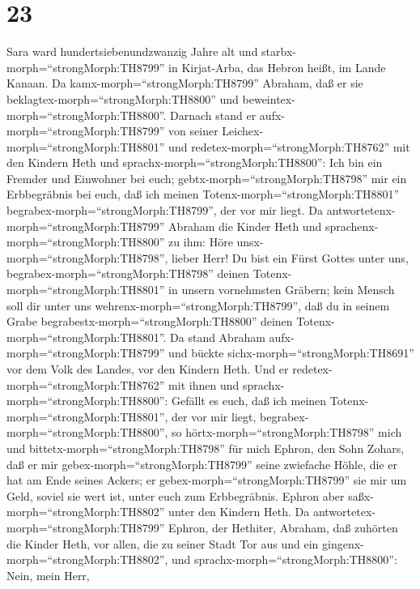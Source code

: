 \hypertarget{section-22}{%
\section{23}\label{section-22}}

 Sara ward hundertsiebenundzwanzig Jahre alt 
und starbx-morph=``strongMorph:TH8799'' in Kirjat-Arba, das Hebron
heißt, im Lande Kanaan. Da kamx-morph=``strongMorph:TH8799'' Abraham,
daß er sie beklagtex-morph=``strongMorph:TH8800'' und
beweintex-morph=``strongMorph:TH8800''.  Darnach stand er
aufx-morph=``strongMorph:TH8799'' von seiner
Leichex-morph=``strongMorph:TH8801'' und
redetex-morph=``strongMorph:TH8762'' mit den Kindern Heth und
sprachx-morph=``strongMorph:TH8800'':  Ich bin ein Fremder
und Einwohner bei euch; gebtx-morph=``strongMorph:TH8798'' mir ein
Erbbegräbnis bei euch, daß ich meinen
Totenx-morph=``strongMorph:TH8801''
begrabex-morph=``strongMorph:TH8799'', der vor mir liegt. 
Da antwortetenx-morph=``strongMorph:TH8799'' Abraham die Kinder Heth und
sprachenx-morph=``strongMorph:TH8800'' zu ihm:  Höre
unsx-morph=``strongMorph:TH8798'', lieber Herr! Du bist ein Fürst Gottes
unter uns, begrabex-morph=``strongMorph:TH8798'' deinen
Totenx-morph=``strongMorph:TH8801'' in unsern vornehmsten Gräbern; kein
Mensch soll dir unter uns wehrenx-morph=``strongMorph:TH8799'', daß du
in seinem Grabe begrabestx-morph=``strongMorph:TH8800'' deinen
Totenx-morph=``strongMorph:TH8801''.  Da stand Abraham
aufx-morph=``strongMorph:TH8799'' und bückte
sichx-morph=``strongMorph:TH8691'' vor dem Volk des Landes, vor den
Kindern Heth.  Und er redetex-morph=``strongMorph:TH8762''
mit ihnen und sprachx-morph=``strongMorph:TH8800'': Gefällt es euch, daß
ich meinen Totenx-morph=``strongMorph:TH8801'', der vor mir liegt,
begrabex-morph=``strongMorph:TH8800'', so
hörtx-morph=``strongMorph:TH8798'' mich und
bittetx-morph=``strongMorph:TH8798'' für mich Ephron, den Sohn Zohars,
 daß er mir gebex-morph=``strongMorph:TH8799'' seine
zwiefache Höhle, die er hat am Ende seines Ackers; er
gebex-morph=``strongMorph:TH8799'' sie mir um Geld, soviel sie wert ist,
unter euch zum Erbbegräbnis.  Ephron aber
saßx-morph=``strongMorph:TH8802'' unter den Kindern Heth. Da
antwortetex-morph=``strongMorph:TH8799'' Ephron, der Hethiter, Abraham,
daß zuhörten die Kinder Heth, vor allen, die zu seiner Stadt Tor aus und
ein gingenx-morph=``strongMorph:TH8802'', und
sprachx-morph=``strongMorph:TH8800'':  Nein, mein Herr,
